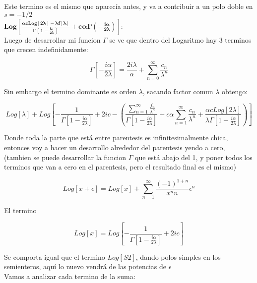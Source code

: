 Este termino es el mismo que aparecía antes, y va a contribuir a un polo doble en $s=-1/2$  \\

$\mathbf{
Log[
	\frac{\alpha c Log[2 \lambda] - \lambda f[\lambda] }{\Gamma (1- \frac{i \alpha}{ 2 \lambda})} + 
	c \alpha \Gamma (- \frac{i \alpha}{2 \lambda}) ] :
}$ \\

Luego de desarrollar mi funcion $\Gamma$ se ve que dentro del Logaritmo hay 3 terminos que crecen indefinidamente:

\begin{equation}
\Gamma [- \frac{i \alpha}{2 \lambda}] = 
\frac{2 i \lambda}{\alpha} + 
\sum _{n=0} ^{\infty} \frac{c _n}{\lambda ^n}
\end{equation}

Sin embargo el termino dominante es orden $\lambda$, sacando factor comun $\lambda$ obtengo:

\begin{equation}
Log[\lambda] + 
Log \left[
	- \frac{1}{\Gamma[1- \frac{i \alpha}{2 \lambda}]} +
	2 i c -
	\left(
		\frac{\sum _{n=1} ^{\infty} \frac{f _n}{\lambda ^n}}
			 {\Gamma[1- \frac{i \alpha}{2 \lambda}]}		
		+ c \alpha \sum _{n=1} ^{\infty} \frac{c _n}{\lambda ^n} +
		\frac{\alpha c Log[2 \lambda]}{\lambda \Gamma [1 - \frac{i \alpha}{2 \lambda} ]}	
		\right)
		\right]		
\end{equation}


Donde toda la parte que está entre parentesis es infinitesimalmente chica, entonces voy a hacer un desarrollo alrededor del parentesis yendo a cero, (tambien se puede desarrollar la funcion $\Gamma$ que está abajo del 1, y poner todos los terminos que van a cero en el parentesis, pero el resultado final es el mismo)

\begin{equation}
Log[x + \epsilon] =
Log[x] + 
\sum _{n=1} ^{\infty}
	\frac{(-1) ^{1+n} }
     	{x ^n n}
     \epsilon ^{n}
\end{equation}

El termino 

\begin{equation}
Log[x] = 
Log \left[
		- \frac{1}{\Gamma [1 - \frac{i \alpha}{2 \lambda}]}
		 + 
		2 i c
		\right]
\end{equation}

Se comporta igual que el termino $ Log[S2] $, dando polos simples en los semienteros, aquí lo nuevo vendrá de las potencias de $\epsilon$ \\
Vamos a analizar cada termino de la suma:

